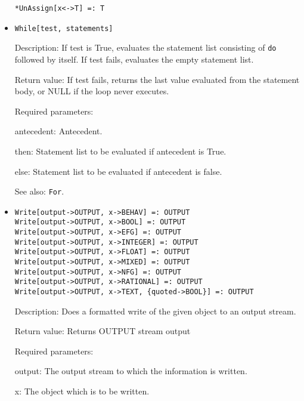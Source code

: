 \begin{itemize}

\protect \large \begin{verbatim}
*UnAssign[x<->T] =: T
\end{verbatim}\normalsize




\item 
\protect \large \begin{verbatim}
While[test, statements]
\end{verbatim} \normalsize
  
\bd
\item
[Description:] If test is True, evaluates the statement list consisting of
\verb+do+ followed by itself.  If test fails, evaluates the empty
statement list.
\item
[Return value:] If test fails, returns the last value evaluated from the
statement body, or NULL if the loop never executes.

\item
[Required parameters:]\hfil\null
\bd
\item
[antecedent:] Antecedent.  
\item
[then:] Statement list to be evaluated if antecedent is True. 
\item
[else:] Statement list to be evaluated if antecedent is false. 
\ed
\item
[See also:] \verb+For+.
\ed

\item
\protect \large \begin{verbatim}
Write[output->OUTPUT, x->BEHAV] =: OUTPUT 
Write[output->OUTPUT, x->BOOL] =: OUTPUT 
Write[output->OUTPUT, x->EFG] =: OUTPUT
Write[output->OUTPUT, x->INTEGER] =: OUTPUT
Write[output->OUTPUT, x->FLOAT] =: OUTPUT
Write[output->OUTPUT, x->MIXED] =: OUTPUT
Write[output->OUTPUT, x->NFG] =: OUTPUT
Write[output->OUTPUT, x->RATIONAL] =: OUTPUT
Write[output->OUTPUT, x->TEXT, {quoted->BOOL}] =: OUTPUT
\end{verbatim}\normalsize

\bd
\item
[Description:] Does a formatted write of the given object to an output
stream. 
\item
[Return value:] Returns OUTPUT stream output
\item
[Required parameters:]\hfil\null

\bd
\item
[output:] The output stream to which the information is written.  
\item
[x:] The object which is to be written.  
\ed
\ed




\end{itemize}










 




















